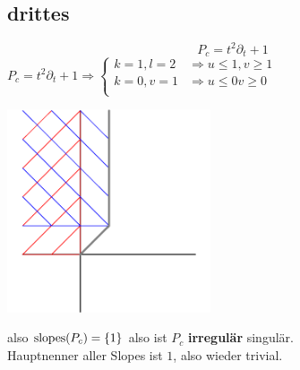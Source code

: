 \subsection{drittes}

\[
  P_c=t^2\partial_t+1
\]
$
P_c=t^2\partial_t+1
\Rightarrow
\begin{cases}
  k=1, l=2 & \Rightarrow u \leq 1, v \geq 1\\
  k=0, v=1 & \Rightarrow u \leq 0  v \geq 0\\
\end{cases}
$
\begin{center}
  \includegraphics[width=6cm]{beispiele/img/c.png}
\end{center}

also $\operatorname{slopes}(P_c)=\{1\}$ also ist $P_c$ \textbf{irregulär} singulär.\\
Hauptnenner aller Slopes ist $1$, also wieder trivial.

